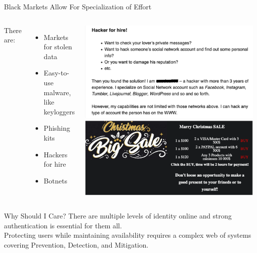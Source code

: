 \documentclass[nobackground,dvipsnames,table]{beamer}
\begin{document}
\begin{frame}{Black Markets Allow For Specialization of Effort}
    \begin{columns}
            There are:
            \begin{itemize}
                \item Markets for stolen data
                \item Easy-to-use malware, like keyloggers 
                \item Phishing kits
                \item Hackers for hire
                \item Botnets 
            \end{itemize}
            \includegraphics[width=\textwidth]{hacker-for-hire}
            \includegraphics[width=\textwidth]{marry-christmas-sale}
    \end{columns}
\end{frame}

\begin{frame}{Why Should I Care?}
    There are multiple levels of identity online and strong authentication is essential for them all. \\
    Protecting users while maintaining availability requires a complex web of systems covering Prevention, Detection, and Mitigation.
\end{frame}
\end{document}
